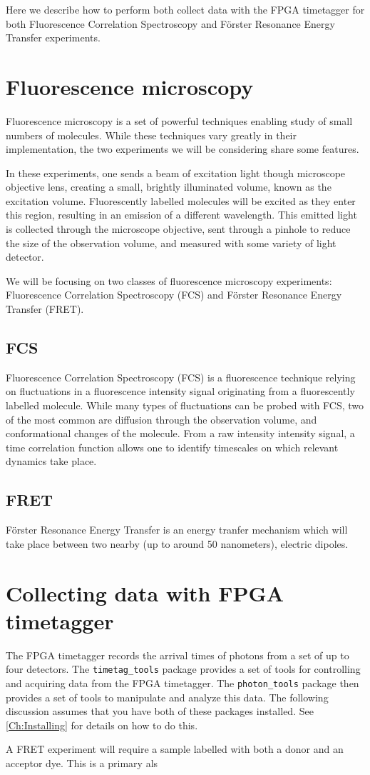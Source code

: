 Here we describe how to perform both collect data with the FPGA
timetagger for both Fluorescence Correlation Spectroscopy and
F\"orster Resonance Energy Transfer experiments.

\section{Fluorescence microscopy}
Fluorescence microscopy is a set of powerful techniques enabling study
of small numbers of molecules. While these techniques vary greatly in
their implementation, the two experiments we will be considering share
some features.

In these experiments, one sends a beam of excitation light though
microscope objective lens, creating a small, brightly illuminated
volume, known as the excitation volume. Fluorescently labelled
molecules will be excited as they enter this region, resulting in an
emission of a different wavelength. This emitted light is collected
through the microscope objective, sent through a pinhole to reduce the
size of the observation volume, and measured with some variety of
light detector.

We will be focusing on two classes of fluorescence microscopy
experiments: Fluorescence Correlation Spectroscopy (FCS) and F\"orster
Resonance Energy Transfer (FRET).

\subsection{FCS}
Fluorescence Correlation Spectroscopy (FCS) is a fluorescence
technique relying on fluctuations in a fluorescence intensity
signal originating from a fluorescently labelled molecule. While many
types of fluctuations can be probed with FCS, two of the most common
are diffusion through the observation volume, and conformational
changes of the molecule. From a raw intensity intensity signal, a time
correlation function allows one to identify timescales on which relevant
dynamics take place.

\subsection{FRET}
F\"orster Resonance Energy Transfer is an energy tranfer mechanism
which will take place between two nearby (up to around 50 nanometers),
electric dipoles.


\section{Collecting data with FPGA timetagger}
The FPGA timetagger records the arrival times of photons from a set of
up to four detectors. The {\tt timetag\_tools} package provides a set
of tools for controlling and acquiring data from the FPGA timetagger.
The {\tt photon\_tools} package then provides a set of tools to
manipulate and analyze this data. The following discussion assumes
that you have both of these packages installed. See
\ref{Ch:Installing} for details on how to do this.



A FRET experiment will require a sample labelled with both a donor
and an acceptor dye. This is a primary als

